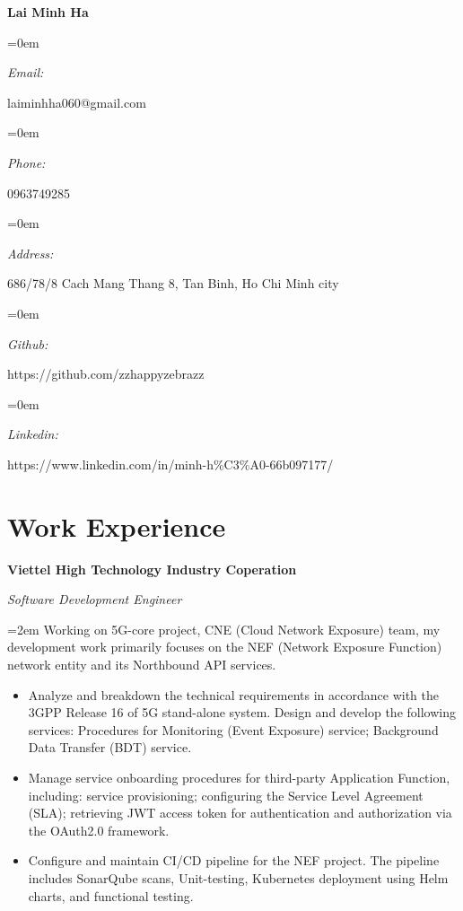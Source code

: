 \documentclass[10pt]{article}
\newlength{\spacebox}
\newcommand{\name}[1]{
\Huge %
\fontfamily{phv}\selectfont %
\begin{center} \textbf{#1} \end{center}\par
\normalsize\normalfont}
\newcommand{\motto}[1]{
  \large %
  \fontfamily{phv}\selectfont %
  \begin{center} \textsl{#1}\end{center}\par
  \normalsize \normalfont}
\newcommand{\info}[2]{
  \noindent\hangindent=0em\hangafter=0
  \parbox{\spacebox}{%
  \textit{#1}} %
  #2 \par} %
\newcommand{\work}[4]{
  \noindent  \textbf{#1}
  \hfill 
\framebox{%
  \parbox{9em}{%
  \centering\textbf{#2}}} \par
  \noindent \textit{#3} \par
  \vspace*{0.5em}
  \noindent\hangindent=2em\hangafter=0 \small #4 
\normalsize \par}
\begin{document}
\name{Lai Minh Ha}
\vspace*{-13pt}
\motto{}

\info{Email:}{laiminhha060@gmail.com}
\info{Phone:}{0963749285}
\info{Address:}{686/78/8 Cach Mang Thang 8, Tan Binh, Ho Chi Minh city}
\info{Github:}{https://github.com/zzhappyzebrazz}
\info{Linkedin:}{https://www.linkedin.com/in/minh-h\%C3\%A0-66b097177/}

\section*{Work Experience}
\work{Viettel High Technology Industry Coperation}
{May 2023--Now}
{Software Development Engineer}
{Working on 5G-core project, CNE (Cloud Network Exposure) team, my development work primarily focuses on the NEF (Network Exposure Function) network entity and its Northbound API services.

\begin{itemize}
    \item Analyze and breakdown the technical requirements in accordance with the 3GPP Release 16 of 5G stand-alone system.
     Design and develop the following services: Procedures for Monitoring (Event Exposure) service; %
     Background Data Transfer (BDT) service.
    \item Manage service onboarding procedures for third-party Application Function, including: service provisioning; configuring the Service Level Agreement (SLA); retrieving JWT access token for authentication and authorization via the OAuth2.0 framework.
    \item Configure and maintain CI/CD pipeline for the NEF project. The pipeline includes SonarQube scans, Unit-testing, Kubernetes deployment using Helm charts, and functional testing.
\end{itemize}}
\end{document}
